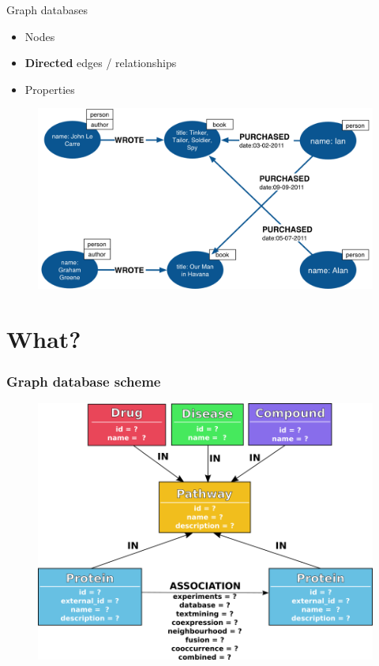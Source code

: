 \documentclass{beamer}
\begin{document}
\begin{frame}{Graph databases}
    \begin{itemize}
        \item Nodes
        \item \textbf{Directed} edges / relationships
        \item Properties
    \end{itemize}
    \begin{figure}
        \centering
        \includegraphics[width=0.75\linewidth]{graph_database.png}
    \end{figure}
\end{frame}


\section{What?}

\begin{frame}
\frametitle{Graph database scheme}
\begin{figure}
    \centering
    \includegraphics[width=0.8\linewidth]{database_scheme.png}
\end{figure}
\end{frame}
\end{document}
